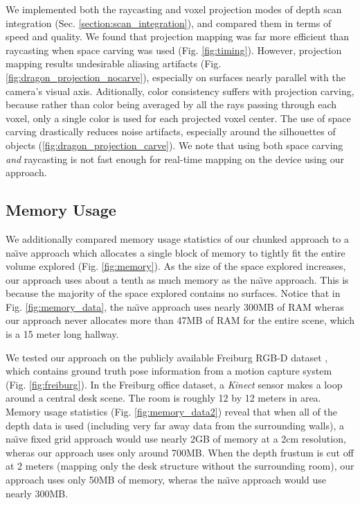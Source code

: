 We implemented both the raycasting and voxel projection modes of depth scan
integration (Sec. \ref{section:scan_integration}), and compared them in terms of
speed and quality. We found that projection mapping was far more efficient than
raycasting when space carving was used (Fig. \ref{fig:timing}). However,
projection mapping results undesirable aliasing artifacts
(Fig. \ref{fig:dragon_projection_nocarve}), especially on surfaces nearly
parallel with the camera's visual axis. Aditionally, color consistency suffers
with projection carving, because rather than color being averaged by all the
rays passing through each voxel, only a single color is used for each projected
voxel center. The use of space carving drastically reduces noise artifacts,
especially around the silhouettes of objects
(\ref{fig:dragon_projection_carve}). We note that using both space carving
\emph{and} raycasting is not fast enough for real-time mapping on the device
using our approach.

\subsection{Memory Usage}
We additionally compared memory usage statistics of our chunked approach to a
na\"{\i}ve approach which allocates a single block of memory to tightly fit the
entire volume explored (Fig. \ref{fig:memory}). As the size of the space
explored increases, our approach uses about a tenth as much memory as the
na\"{\i}ve approach. This is because the majority of the space explored contains no
surfaces. Notice that in Fig. \ref{fig:memory_data}, the na\"{\i}ve approach uses
nearly 300MB of RAM wheras our approach never allocates more than 47MB of RAM
for the entire scene, which is a 15 meter long hallway.

We tested our approach on the publicly available Freiburg RGB-D dataset
\cite{FREIBURG}, which contains ground truth pose information from a motion
capture system (Fig. \ref{fig:freiburg}). In the Freiburg office dataset, a
\textit{Kinect} sensor makes a loop around a central desk scene. The room is
roughly 12 by 12 meters in area.  Memory usage statistics (Fig.
\ref{fig:memory_data2}) reveal that when all of the depth data is used
(including very far away data from the surrounding walls), a na\"{\i}ve fixed grid
approach would use nearly 2GB of memory at a 2cm resolution, wheras our
approach uses only around 700MB. When the depth frustum is cut off at 2 meters
(mapping only the desk structure without the surrounding room), our approach
uses only 50MB of memory, wheras the na\"{\i}ve approach would use nearly 300MB.


